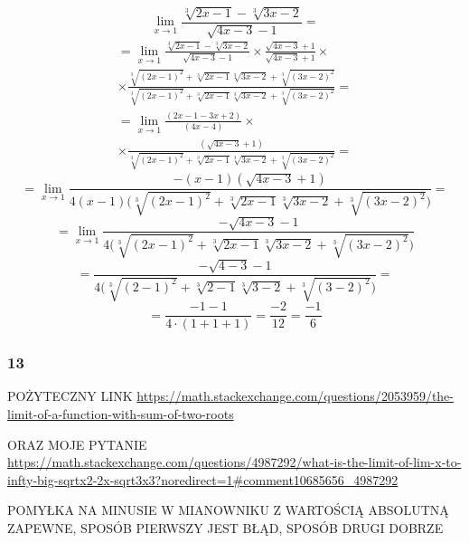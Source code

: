 \documentclass{article}
\begin{document}
\begin{equation*}
    \lim_{x \to 1} \frac{\sqrt[3]{2x - 1} - \sqrt[3]{3x - 2}}{\sqrt{4x - 3} - 1} = 
\end{equation*}
\begin{multline*}
    = \lim_{x \to 1} \frac{\sqrt[3]{2x - 1} - \sqrt[3]{3x - 2}}{\sqrt{4x - 3} - 1} \times \frac{\sqrt{4x - 3} + 1}{\sqrt{4x - 3} + 1} \times \\ 
    \times \frac{\sqrt[3]{(2x - 1)^2} + \sqrt[3]{2x - 1}\sqrt[3]{3x - 2} + \sqrt[3]{(3x - 2)^2}}{\sqrt[3]{(2x - 1)^2} + \sqrt[3]{2x - 1}\sqrt[3]{3x - 2} + \sqrt[3]{(3x - 2)^2}} =
\end{multline*}
\begin{multline*}
    = \lim_{x \to 1} \frac{(2x - 1 - 3x + 2)}{(4x - 4)} \times \\ 
    \times \frac{(\sqrt{4x - 3} + 1)}{\sqrt[3]{(2x - 1)^2} + \sqrt[3]{2x - 1}\sqrt[3]{3x - 2} + \sqrt[3]{(3x - 2)^2}} =
\end{multline*}
\begin{equation*}
    = \lim_{x \to 1} \frac{-(x - 1)(\sqrt{4x - 3} + 1)}{4(x - 1)\Bigg(\sqrt[3]{(2x - 1)^2} + \sqrt[3]{2x - 1}\sqrt[3]{3x - 2} + \sqrt[3]{(3x - 2)^2}\Bigg)} =
\end{equation*}
\begin{equation*}
    = \lim_{x \to 1} \frac{-\sqrt{4x - 3} - 1}{4 \Bigg(\sqrt[3]{(2x - 1)^2} + \sqrt[3]{2x - 1}\sqrt[3]{3x - 2} + \sqrt[3]{(3x - 2)^2}\Bigg)}
\end{equation*}
\begin{equation*}
    = \frac{-\sqrt{4 - 3} - 1}{4 \Bigg(\sqrt[3]{(2 - 1)^2} + \sqrt[3]{2 - 1}\sqrt[3]{3 - 2} + \sqrt[3]{(3 - 2)^2}\Bigg)} = 
\end{equation*}
\begin{equation*}
    = \frac{-1 - 1}{4 \cdot (1 + 1 + 1)} = \frac{-2}{12} = \frac{-1}{6}
\end{equation*}


\subsubsection*{13}

\begin{center}
    POŻYTECZNY LINK  \url{https://math.stackexchange.com/questions/2053959/the-limit-of-a-function-with-sum-of-two-roots}
\end{center}
\begin{center}
    ORAZ MOJE PYTANIE  \url{https://math.stackexchange.com/questions/4987292/what-is-the-limit-of-lim-x-to-infty-big-sqrtx2-2x-sqrt3x3?noredirect=1#comment10685656_4987292}
\end{center}
\begin{center}
    POMYŁKA NA MINUSIE W MIANOWNIKU Z WARTOŚCIĄ ABSOLUTNĄ ZAPEWNE, SPOSÓB PIERWSZY JEST BŁĄD, SPOSÓB DRUGI DOBRZE
\end{center}
\end{document}
